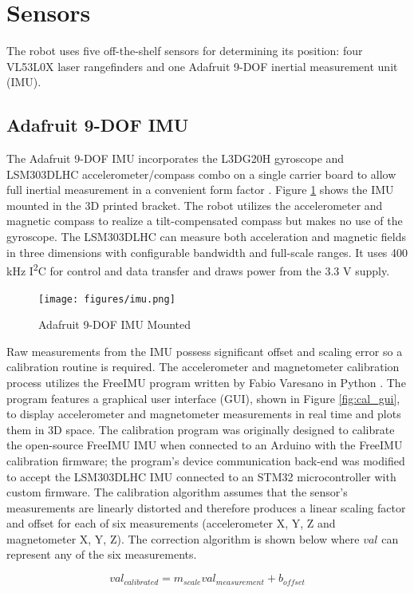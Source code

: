 \section{Sensors}
The robot uses five off-the-shelf sensors for determining its position: four VL53L0X laser rangefinders and one Adafruit 9-DOF inertial measurement unit (IMU).

\subsection{Adafruit 9-DOF IMU}
The Adafruit 9-DOF IMU incorporates the L3DG20H gyroscope and LSM303DLHC accelerometer/compass combo on a single carrier board to allow full inertial measurement in a convenient form factor \cite{adafruit_imu}. Figure \ref{fig:imu} shows the IMU mounted in the 3D printed bracket. The robot utilizes the accelerometer and magnetic compass to realize a tilt-compensated compass but makes no use of the gyroscope. The LSM303DLHC can measure both acceleration and magnetic fields in three dimensions with configurable bandwidth and full-scale ranges. It uses 400 kHz I\textsuperscript{2}C for control and data transfer and draws power from the 3.3 V supply. 
\begin{figure}[H]   %
	\centering \texttt{[image: figures/imu.png]}
	\caption{Adafruit 9-DOF IMU Mounted}\label{fig:imu}
\end{figure}

Raw measurements from the IMU possess significant offset and scaling error so a calibration routine is required. The accelerometer and magnetometer calibration process utilizes the FreeIMU program written by Fabio Varesano in Python \cite{freeimu}. The program features a graphical user interface (GUI), shown in Figure \ref{fig:cal_gui},  to display accelerometer and magnetometer measurements in real time and plots them in 3D space. The calibration program was originally designed to calibrate the open-source FreeIMU IMU when connected to an Arduino with the FreeIMU calibration firmware; the program's device communication back-end was modified to accept the LSM303DLHC IMU connected to an STM32 microcontroller with custom firmware. The calibration algorithm assumes that the sensor's measurements are linearly distorted and therefore produces a linear scaling factor and offset for each of six measurements (accelerometer X, Y, Z and magnetometer X, Y, Z). The correction algorithm is shown below where $val$ can represent any of the six measurements.

\begin{equation}
val_{calibrated} = m_{scale} val_{measurement} + b_{offset}
\end{equation}

